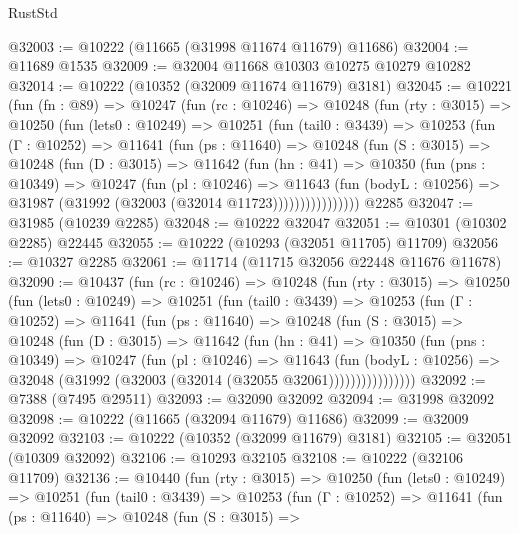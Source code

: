 \begin{lexlean}{RustStd}
\begin{coremodule}
@32003 := @10222 (@11665 (@31998 @11674 @11679) @11686)
@32004 := @11689 @1535
@32009 := @32004 @11668 @10303 @10275 @10279 @10282
@32014 := @10222 (@10352 (@32009 @11674 @11679) @3181)
@32045 := @10221
    (fun (fn : @89) =>
    @10247
      (fun (rc : @10246) =>
      @10248
        (fun (rty : @3015) =>
        @10250
          (fun (lets0 : @10249) =>
          @10251
            (fun (tail0 : @3439) =>
            @10253
              (fun (Γ : @10252) =>
              @11641
                (fun (ps : @11640) =>
                @10248
                  (fun (S : @3015) =>
                  @10248
                    (fun (D : @3015) =>
                    @11642
                      (fun (hn : @41) =>
                      @10350
                        (fun (pns : @10349) =>
                        @10247
                          (fun (pl : @10246) =>
                          @11643
                            (fun (bodyL : @10256) =>
                            @31987 (@31992 (@32003 (@32014 @11723))))))))))))))))
    @2285
@32047 := @31985 (@10239 @2285)
@32048 := @10222 @32047
@32051 := @10301 (@10302 @2285) @22445
@32055 := @10222 (@10293 (@32051 @11705) @11709)
@32056 := @10327 @2285
@32061 := @11714 (@11715 @32056 @22448 @11676 @11678)
@32090 := @10437
    (fun (rc : @10246) =>
    @10248
      (fun (rty : @3015) =>
      @10250
        (fun (lets0 : @10249) =>
        @10251
          (fun (tail0 : @3439) =>
          @10253
            (fun (Γ : @10252) =>
            @11641
              (fun (ps : @11640) =>
              @10248
                (fun (S : @3015) =>
                @10248
                  (fun (D : @3015) =>
                  @11642
                    (fun (hn : @41) =>
                    @10350
                      (fun (pns : @10349) =>
                      @10247
                        (fun (pl : @10246) =>
                        @11643
                          (fun (bodyL : @10256) =>
                          @32048 (@31992 (@32003 (@32014 (@32055 @32061))))))))))))))))
@32092 := @7388 (@7495 @29511)
@32093 := @32090 @32092
@32094 := @31998 @32092
@32098 := @10222 (@11665 (@32094 @11679) @11686)
@32099 := @32009 @32092
@32103 := @10222 (@10352 (@32099 @11679) @3181)
@32105 := @32051 (@10309 @32092)
@32106 := @10293 @32105
@32108 := @10222 (@32106 @11709)
@32136 := @10440
    (fun (rty : @3015) =>
    @10250
      (fun (lets0 : @10249) =>
      @10251
        (fun (tail0 : @3439) =>
        @10253
          (fun (Γ : @10252) =>
          @11641
            (fun (ps : @11640) =>
            @10248
              (fun (S : @3015) =>

\end{coremodule}
\end{lexlean}
